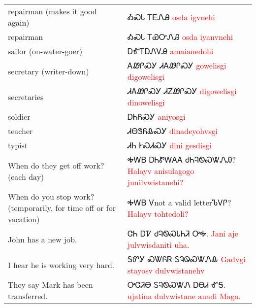 \begin{multicols}
\vfill\newpage\begin{minipage}{\linewidth}\begin{tabular}{p{5cm} p{9cm}}
repairman (makes it good again) & ᎣᏍᏓ ᎢᎬᏁᎯ 
 \newline \textcolor{red}{osda igvnehi}\\
repairman & ᎣᏍᏓ ᎢᏯᏅᏁᎯ 
 \newline \textcolor{red}{osda iyanvnehi}\\
sailor (on-water-goer) & ᎠᎹᎢᎠᏁᏙᎯ 
 \newline \textcolor{red}{amaianedohi}\\
secretary (writer-down) & ᎪᏪᎵᏍᎩ ᏗᎪᏪᎵᏍᎩ 
 \newline \textcolor{red}{gowelisgi digowelisgi}\\
secretaries & ᏗᎪᏪᎵᏍᎩ ᏗᏃᏪᎵᏍᎩ 
 \newline \textcolor{red}{digowelisgi dinowelisgi}\\
soldier & ᎠᏂᏲᏍᎩ 
 \newline \textcolor{red}{aniyosgi}\\
teacher & ᏗᎾᏕᏲᎲᏍᎩ 
 \newline \textcolor{red}{dinadeyohvsgi}\\
typist & ᏗᏂ ᎨᏍᏗᏍᎩ 
 \newline \textcolor{red}{dini gesdisgi}\\
When do they get off work? (each day) & ᎭᎳᏴ ᎠᏂᏑᎳᎪᎪ ᏧᏂᎸᏫᏍᏔᏁᎯ? 
 \newline \textcolor{red}{Halayv anisulagogo junilvwistanehi?}\\
When do you stop work? (temporarily, for time off or for vacation) & ᎭᎳᏴ Ꮩnot a valid letterᏖᏙᎵ? 
 \newline \textcolor{red}{Halayv tohtedoli?}\\
John has a new job. & ᏣᏂ ᎠᏤ ᏧᎸᏫᏍᏓᏂᏘ ᎤᎭ. 
 \newline \textcolor{red}{Jani aje julvwisdaniti uha.}\\
I hear he is working very hard. & ᎦᏛᎩ ᏍᏔᏲᏒ ᏚᎸᏫᏍᏔᏁᎲ 
 \newline \textcolor{red}{Gadvgi stayosv dulvwistanehv}\\
They say Mark has been transferred. & ᎤᏣᏘᎾ ᏚᎸᏫᏍᏔᏁ ᎠᎾᏗ ᎹᎦ. 
 \newline \textcolor{red}{ujatina dulvwistane anadi Maga.}\\
\end{tabular}
\end{minipage}


\end{multicols}
